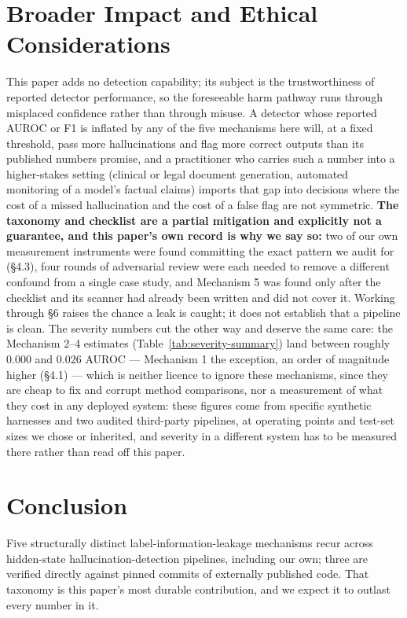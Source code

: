 \documentclass[10pt]{article} %
\begin{document}
\section{Broader Impact and Ethical Considerations}
\label{sec:impact}

This paper adds no detection capability; its subject is the trustworthiness of
reported detector performance, so the foreseeable harm pathway runs through
misplaced confidence rather than through misuse. A detector whose reported
AUROC or F1 is inflated by any of the five mechanisms here will, at a fixed
threshold, pass more hallucinations and flag more correct outputs than its
published numbers promise, and a practitioner who carries such a number into a
higher-stakes setting (clinical or legal document generation, automated
monitoring of a model's factual claims) imports that gap into decisions where
the cost of a missed hallucination and the cost of a false flag are not
symmetric. \textbf{The taxonomy and checklist are a partial mitigation and
explicitly not a guarantee, and this paper's own record is why we say so:}
two of our own measurement instruments were found committing the exact
pattern we audit for (§4.3), four rounds of adversarial review were each
needed to remove a different confound from a single case study, and
Mechanism 5 was found only after the checklist and its scanner had already
been written and did not cover it. Working through §6 raises the chance a
leak is caught; it does not establish that a pipeline is clean. The severity
numbers cut the other way and deserve the same care: the Mechanism 2--4
estimates (Table~\ref{tab:severity-summary}) land between roughly $0.000$
and $0.026$ AUROC --- Mechanism 1 the exception, an order of magnitude higher
(§4.1) --- which is neither licence to ignore these mechanisms, since they
are cheap to fix and corrupt method comparisons, nor a measurement of what
they cost in any deployed system: these figures come from specific synthetic
harnesses and two audited third-party pipelines, at operating points and
test-set sizes we chose or inherited, and severity in a different system has
to be measured there rather than read off this paper.

\section{Conclusion}

Five structurally distinct label-information-leakage mechanisms recur across
hidden-state hallucination-detection pipelines, including our own; three are
verified directly against pinned commits of externally published code. That
taxonomy is this paper's most durable contribution, and we expect it to outlast
every number in it.
\end{document}
